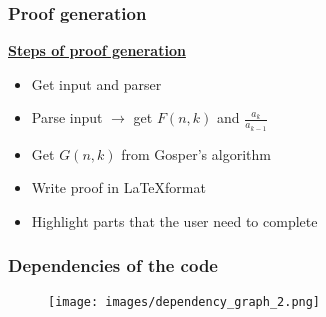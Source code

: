 \documentclass{beamer}
\newcommand{\ubf}[1]{\underline{\textbf{#1}}}
\begin{document}
\begin{frame}
  \frametitle{Proof generation}
  \ubf{Steps of proof generation}
  \pause
  \begin{itemize}
    \item Get input and parser
    \pause
    \item Parse input $\rightarrow$ get $F(n,k)$ and $\frac{a_k}{a_{k-1}}$
    \pause
    \item Get $G(n,k)$ from Gosper's algorithm
    \pause
    \item Write proof in \LaTeX format
    \pause
    \item Highlight parts that the user need to complete
  \end{itemize}
\end{frame}
\begin{frame}
  \frametitle{Dependencies of the code}
  \begin{figure}
  \texttt{[image: images/dependency\_graph\_2.png]}
  \end{figure}
\end{frame}
\end{document}
